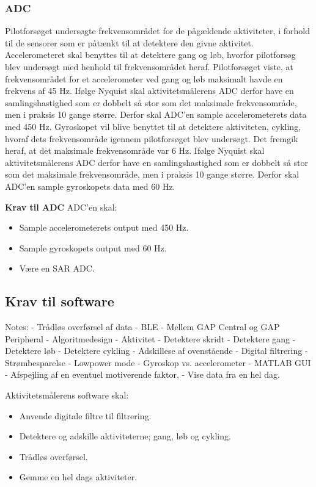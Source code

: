 \subsubsection{ADC}
Pilotforsøget undersøgte frekvensområdet for de pågældende aktiviteter, i forhold til de sensorer som er påtænkt til at detektere den givne aktivitet.\newline
Accelerometeret skal benyttes til at detektere gang og løb, hvorfor pilotforsøg blev undersøgt med henhold til frekvensområdet heraf. Pilotforsøget viste, at frekvensområdet for et accelerometer ved gang og løb maksimalt havde en frekvens af 45 Hz. Ifølge Nyquist skal aktivitetsmålerens ADC derfor have en samlingshastighed som er dobbelt så stor som det maksimale frekvensområde, men i praksis 10 gange større. Derfor skal ADC'en sample accelerometerets data med 450 Hz.\newline
Gyroskopet vil blive benyttet til at detektere aktiviteten, cykling, hvoraf dets frekvensområde igennem pilotforsøget blev undersøgt. Det fremgik heraf, at det maksimale frekvensområde var 6 Hz. Ifølge Nyquist skal aktivitetsmålerens ADC derfor have en samlingshastighed som er dobbelt så stor som det maksimale frekvensområde, men i praksis 10 gange større. Derfor skal ADC'en sample gyroskopets data med 60 Hz.

\textbf{Krav til ADC} \newline
ADC'en skal:
\begin{itemize}
\item Sample accelerometerets output med 450 Hz.
\item Sample gyroskopets output med 60 Hz. 
\item Være en SAR ADC. 
\end{itemize}



\subsection{Krav til software}

Notes: 
- Trådløs overførsel af data
	- BLE
	- Mellem GAP Central og GAP Peripheral
- Algoritmedesign 
	- Aktivitet
		- Detektere skridt
		- Detektere gang 
		- Detektere løb
		- Detektere cykling
		- Adskillese af ovenstående
		- Digital filtrering 
	- Strømbesparelse 
		- Lowpower mode
		- Gyroskop vs. accelerometer
- MATLAB GUI
	- Afspejling af en eventuel motiverende faktor, 
	- Vise data fra en hel dag. 
		


Aktivitetsmålerens software skal:
\begin{itemize}
\item Anvende digitale filtre til filtrering.
\item Detektere og adskille aktiviteterne; gang, løb og cykling. 
\item Trådløs overførsel.
\item Gemme en hel dags aktiviteter. 
\end{itemize}
